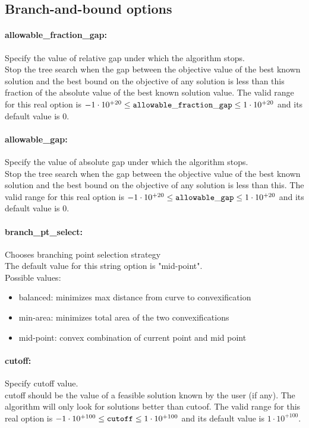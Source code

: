 \subsection{Branch-and-bound options}
\label{sec:Branch-and-bound_options}
\paragraph{allowable\_fraction\_gap:} Specify the value of relative gap under which the algorithm stops. $\;$ \\
 Stop the tree search when the gap between the
objective value of the best known solution and
the best bound on the objective of any solution
is less than this fraction of the absolute value
of the best known solution value. The valid range for this real option is 
$-1 \cdot 10^{+20} \le {\tt allowable\_fraction\_gap } \le 1 \cdot 10^{+20}$
and its default value is $0$.


\paragraph{allowable\_gap:} Specify the value of absolute gap under which the algorithm stops. $\;$ \\
 Stop the tree search when the gap between the
objective value of the best known solution and
the best bound on the objective of any solution
is less than this. The valid range for this real option is 
$-1 \cdot 10^{+20} \le {\tt allowable\_gap } \le 1 \cdot 10^{+20}$
and its default value is $0$.


\paragraph{branch\_pt\_select:} Chooses branching point selection strategy $\;$ \\

The default value for this string option is "mid-point".
\\ 
Possible values:
\begin{itemize}
   \item balanced: minimizes max distance from curve to
convexification
   \item min-area: minimizes total area of the two convexifications
   \item mid-point: convex combination of current point and mid
point
\end{itemize}

\paragraph{cutoff:} Specify cutoff value. $\;$ \\
 cutoff should be the value of a feasible solution
known by the user (if any). The algorithm will
only look for solutions better than cutoof. The valid range for this real option is 
$-1 \cdot 10^{+100} \le {\tt cutoff } \le 1 \cdot 10^{+100}$
and its default value is $1 \cdot 10^{+100}$.


